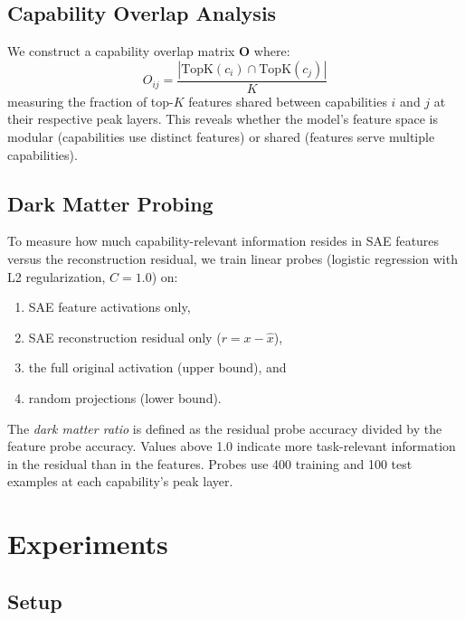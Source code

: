 \documentclass{article}
\newcommand{\topk}{\text{TopK}}
\begin{document}
\subsection{Capability Overlap Analysis}

We construct a capability overlap matrix $\mathbf{O}$ where:
\begin{equation}
    O_{ij} = \frac{|\topk(c_i) \cap \topk(c_j)|}{K}
\end{equation}
measuring the fraction of top-$K$ features shared between capabilities $i$ and $j$ at their respective peak layers. This reveals whether the model's feature space is modular (capabilities use distinct features) or shared (features serve multiple capabilities).

\subsection{Dark Matter Probing}

To measure how much capability-relevant information resides in SAE features versus the reconstruction residual, we train linear probes (logistic regression with L2 regularization, $C = 1.0$) on:
\begin{enumerate}
    \item SAE feature activations only,
    \item SAE reconstruction residual only ($r = x - \hat{x}$),
    \item the full original activation (upper bound), and
    \item random projections (lower bound).
\end{enumerate}

The \emph{dark matter ratio} is defined as the residual probe accuracy divided by the feature probe accuracy. Values above 1.0 indicate more task-relevant information in the residual than in the features. Probes use 400 training and 100 test examples at each capability's peak layer.

\section{Experiments}
\label{sec:experiments}

\subsection{Setup}
\end{document}
